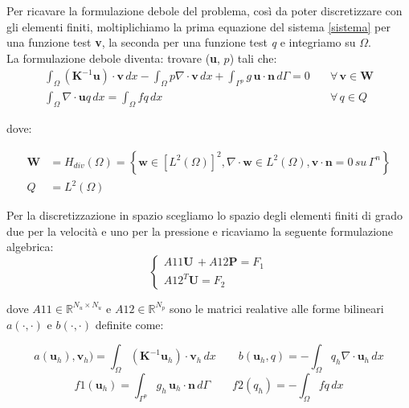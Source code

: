 Per ricavare la formulazione debole del problema, così da poter discretizzare con gli elementi finiti, moltiplichiamo la prima equazione del sistema \ref{sistema} per una funzione test \textbf{v}, la seconda per una funzione test \textit{q} e integriamo su $\Omega$. \\
La formulazione debole diventa: trovare (\textbf{u}, $p$) tali che:
\begin{equation}
\begin{split}
\int_{\Omega} (\textbf{K}^{-1} \textbf{u}) \cdot \textbf{v} \, dx  - \int_{\Omega} p \nabla \cdot \textbf{v} \, dx  + \int_{\Gamma^p} g \, \textbf{u} \cdot \textbf{n} \, d\Gamma = 0 & \quad  \forall \, \textbf{v} \in \textbf{W} \\
\int_{\Omega} \nabla \cdot \textbf{u} q \, dx = \int_{\Omega} f q \, dx & \quad \forall \, q \in Q
\end{split}
\end{equation}\label{formdebole}

dove: 

\begin{equation*}
\begin{split}
\textbf{W} &=H_{div}(\Omega) = \left \{ \textbf{w}\in [L^2(\Omega)]^2, \nabla \cdot \textbf{w} \in L^2(\Omega), \textbf{v} \cdot \textbf{n} = 0 \, su \, \Gamma^n \right \} \\
Q &= L^2(\Omega) 
\end{split}
\end{equation*}

Per la discretizzazione in spazio scegliamo lo spazio degli elementi finiti di grado due per la velocità e uno per la pressione e ricaviamo la seguente formulazione algebrica:
\begin{equation}
\begin{cases}
A11 \textbf{U} \, +A12 \textbf{P} = F_1 \\
A12^T \textbf{U} = F_2
\end{cases}
\end{equation}


dove $ A11 \in \mathbb{R}^{N_u \times N_u}$ e $A12 \in \mathbb{R}^{N_p}$  sono le matrici realative alle forme bilineari $a(\cdot, \cdot)$ e $b(\cdot, \cdot)$ definite come:

$$ a(\textbf{u}_h ), \textbf{v}_h)= \int_{\Omega} (\textbf{K}^{-1} \textbf{u}_h) \cdot \textbf{v}_h \, dx \qquad b(\textbf{u}_h, q) = - \int_{\Omega} q_h \nabla \cdot \textbf{u}_h \, dx  $$
$$ f1(\textbf{u}_h) = \int_{\Gamma^p} g_h \, \textbf{u}_h \cdot \textbf{n} \, d\Gamma \qquad f2(q_h) =  - \int_{\Omega} f q \, dx $$

